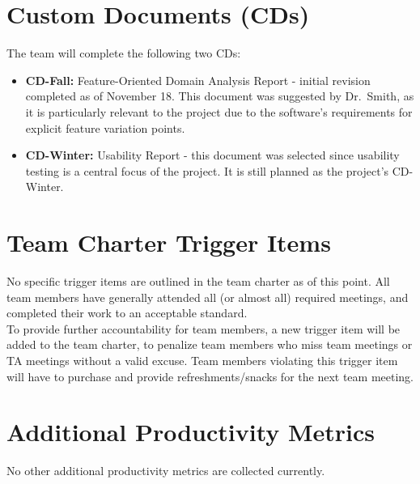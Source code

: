\documentclass{article}
\begin{document}
\section{Custom Documents (CDs)}

The team will complete the following two CDs:

\begin{itemize}
	\item \textbf{CD-Fall:} Feature-Oriented Domain Analysis Report - initial 
	revision completed as of November 18. This document was suggested by 
	Dr.~Smith, as it is particularly relevant to the project due to the 
	software's 
	requirements for explicit feature variation points.
	\item \textbf{CD-Winter:} Usability Report - this document was selected 
	since 
	usability testing is a central focus of the project. It is still planned as 
	the project's CD-Winter.
\end{itemize}

\section{Team Charter Trigger Items}

No specific trigger items are outlined in the team charter as of this point. 
All team members have generally attended all (or almost all) required meetings, 
and completed their work to an acceptable standard.\\

\noindent To provide further accountability for team members, a new trigger 
item will be 
added to the team charter, to penalize team members who miss team meetings or 
TA meetings without a valid excuse. Team members violating this trigger item 
will have to purchase and provide refreshments/snacks for the next team meeting.

\section{Additional Productivity Metrics}

No other additional productivity metrics are collected currently.\\



\end{document}
